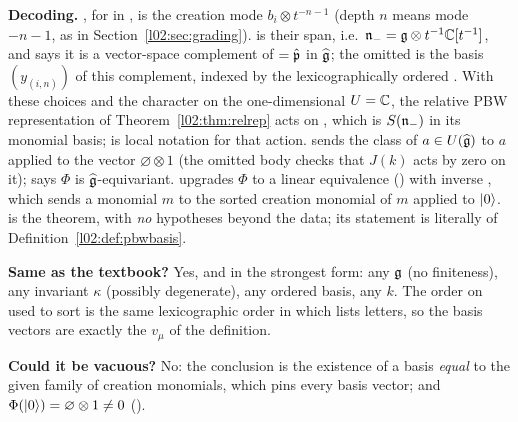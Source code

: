 \begin{dictionary}
\textbf{Decoding.} , for  in , is the creation mode
$b_i\otimes t^{-n-1}$ (depth $n$ means mode $-n-1$, as in Section~\ref{l02:sec:grading}).  is
their span, i.e.\ $\mathfrak{n}_- = \mathfrak{g}\otimes t^{-1}{\mathbb{C}}[t^{-1}]$, and  says it is a vector-space
complement of  $=\hat{\mathfrak{p}}$ in $\widehat{\mathfrak{g}}$; the omitted  is the basis
$(y_{(i,n)})$ of this complement, indexed by the lexicographically ordered . With these choices
and the character  on the one-dimensional $U = {\mathbb{C}}$, the relative PBW representation of
Theorem~\ref{l02:thm:relrep} acts on , which is $S(\mathfrak{n}_-)$ in its monomial
basis;  is local notation for that action.  sends the class of $a\in U(\widehat{\mathfrak{g}})$ to $a$
applied to the vector $\varnothing\otimes1$ (the omitted body checks that $J(k)$ acts by zero on it);
 says $\Phi$ is $\widehat{\mathfrak{g}}$-equivariant.  upgrades $\Phi$ to a linear equivalence
() with inverse , which sends a monomial $m$ to the sorted creation monomial of $m$
applied to $|0\rangle$.  is the theorem, with \emph{no} hypotheses beyond the data; its
statement is literally  of Definition~\ref{l02:def:pbwbasis}.

\textbf{Same as the textbook?} Yes, and in the strongest form: any $\mathfrak{g}$ (no finiteness), any invariant
$\kappa$ (possibly degenerate), any ordered basis, any $k$. The order on  used to sort is the
same lexicographic order in which  lists letters, so the basis vectors are exactly the
$v_\mu$ of the definition.

\textbf{Could it be vacuous?} No: the conclusion is the existence of a basis \emph{equal} to the given
family of creation monomials, which pins every basis vector; and $\Phi(|0\rangle) = \varnothing\otimes1\ne0$
().
\end{dictionary}

